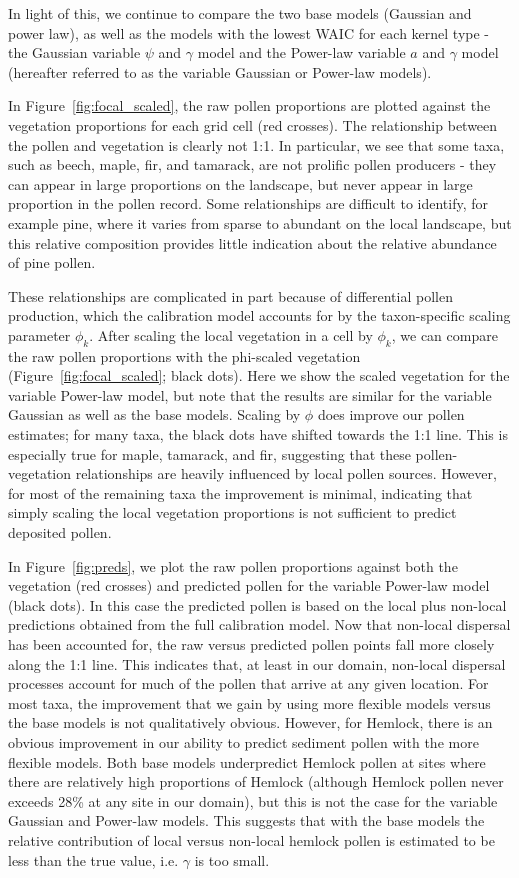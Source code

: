 \documentclass[12pt]{article}
\begin{document}
In light of this, we continue to compare the two base models (Gaussian
and power law), as well as the models with the lowest WAIC for each
kernel type - the Gaussian variable $\psi$ and $\gamma$ model and the
Power-law variable $a$ and $\gamma$ model (hereafter referred to as
the variable Gaussian or Power-law models).

In Figure~\ref{fig:focal_scaled}, the raw pollen proportions are
plotted against the vegetation proportions for each grid cell (red
crosses). The relationship between the pollen and vegetation is
clearly not 1:1. In particular, we see that some taxa, such as beech,
maple, fir, and tamarack, are not prolific pollen producers
- they can appear in large proportions on the landscape, but never
appear in large proportion in the pollen record. Some relationships
are difficult to identify, for example pine, where it varies from
sparse to abundant on the local landscape, but this relative
composition provides little indication about the relative abundance of
pine pollen.

These relationships are complicated in part because of differential
pollen production, which the calibration model accounts for by the
taxon-specific scaling parameter $\phi_k$. After scaling the local
vegetation in a cell by $\phi_k$, we can compare the raw pollen
proportions with the phi-scaled vegetation
(Figure~\ref{fig:focal_scaled}; black dots). Here we show the scaled
vegetation for the variable Power-law model, but note that the results
are similar for the variable Gaussian as well as the base
models. Scaling by $\phi$ does improve our pollen estimates; for many
taxa, the black dots have shifted towards the 1:1 line. This is
especially true for maple, tamarack, and fir, suggesting
that these pollen-vegetation relationships are heavily influenced by
local pollen sources. However, for most of the remaining taxa the
improvement is minimal, indicating that simply scaling the local
vegetation proportions is not sufficient to predict deposited pollen.

In Figure~\ref{fig:preds}, we plot the raw pollen proportions against
both the vegetation (red crosses) and predicted pollen for the
variable Power-law model (black dots). In this case the predicted
pollen is based on the local plus non-local predictions obtained from
the full calibration model. Now that non-local dispersal has been
accounted for, the raw versus predicted pollen points fall more
closely along the 1:1 line. This indicates that, at least in our
domain, non-local dispersal processes account for much of the pollen
that arrive at any given location. For most taxa, the improvement that
we gain by using more flexible models versus the base models is not
qualitatively obvious. However, for Hemlock, there is an obvious
improvement in our ability to predict sediment pollen with the more
flexible models. Both base models underpredict Hemlock pollen at sites
where there are relatively high proportions of Hemlock (although
Hemlock pollen never exceeds 28\% at any site in our domain), but this
is not the case for the variable Gaussian and Power-law models. This
suggests that with the base models the relative contribution of local
versus non-local hemlock pollen is estimated to be less than the true
value, i.e. $\gamma$ is too small.
\end{document}

